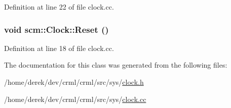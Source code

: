 Definition at line 22 of file clock.cc.

\hypertarget{classscm_1_1_clock_a2cba6acacbe895ce53d40c25bc156427}{
\subsubsection[{Reset}]{\setlength{\rightskip}{0pt plus 5cm}void scm::Clock::Reset ()}}
\label{classscm_1_1_clock_a2cba6acacbe895ce53d40c25bc156427}


Definition at line 18 of file clock.cc.



The documentation for this class was generated from the following files:\begin{DoxyCompactItemize}
\item 
/home/derek/dev/crml/crml/src/sys/\hyperlink{clock_8h}{clock.h}\item 
/home/derek/dev/crml/crml/src/sys/\hyperlink{clock_8cc}{clock.cc}\end{DoxyCompactItemize}

